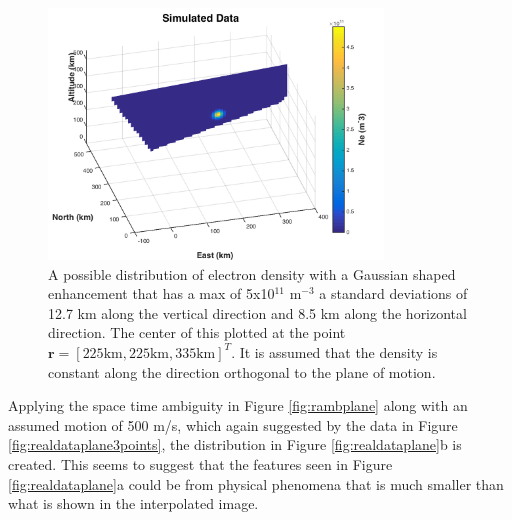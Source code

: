\begin{figure}[h!]
	\centering
	\includegraphics[width=3.5in]{simdataplaneorig}
	\caption{A possible distribution of electron density with a Gaussian shaped enhancement that has a max of 5x10$^{11}$ m$^{-3}$  a standard deviations of 12.7 km along the vertical direction and 8.5 km along the horizontal direction. The center of this plotted at the point $\mathbf{r}=[ 225\text{km}, 225 \text{km},335\text{km}]^T$. It is assumed that the density is constant along the direction orthogonal to the plane of motion.}
	\label{fig:simdataplaneorig}
\end{figure}

Applying the space time ambiguity in Figure \ref{fig:rambplane} along with an assumed motion of 500 m/s, which again suggested by the data in Figure \ref{fig:realdataplane3points}, the distribution in Figure \ref{fig:realdataplane}b is created. This seems to suggest that the features seen in Figure \ref{fig:realdataplane}a could be from physical phenomena that is much smaller than what is shown in the interpolated image. 


